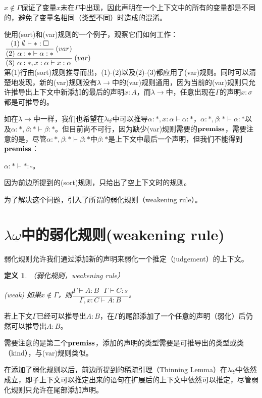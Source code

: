 \documentclass[UTF8]{article}
\newtheorem{thm}{定义}[section]
\begin{document}
		$x\not\in\Gamma$保证了变量$x$未在$\Gamma$中出现，因此声明在一个上下文中的所有的变量都是不同的，避免了变量名相同（类型不同）时造成的混淆。

		使用(sort)和(var)规则的一个例子，观察它们如何工作：\\

		$\cfrac{\cfrac{(1)\ \emptyset\vdash*:\square}{(2)\ \alpha:*\vdash\alpha:*}\ (var)}{(3)\ \alpha:*,x:\alpha\vdash x:\alpha}\ (var)$\\
		
		第(1)行由(sort)规则推导而出，(1)-(2)以及(2)-(3)都应用了(var)规则。同时可以清楚地发现，新的(var)规则没有$\lambda{\rightarrow}$中的(var)规则通用，因为当前的(var)规则只允许推导出上下文中新添加的最后的声明$x:A$，而$\lambda{\rightarrow}$中，任意出现在$\Gamma$的声明$x:\sigma$都是可推导的。
		
		如在$\lambda\rightarrow$中一样，我们也希望在$\lambda{\underline{\omega}}$中可以推导$\alpha:*,x:\alpha\vdash\alpha:*$，$\alpha:*,\beta:*\vdash\alpha:*$以及$\alpha:*,\beta:*\vdash\beta:*$。但目前尚不可行，因为缺少(var)规则需要的$\bf premiss$，需要注意的是，尽管$\alpha:*,\beta:*\vdash\beta:*$中$\beta:*$是上下文中最后一个声明，但我们不能得到$\bf premiss$：
		
		$\alpha:*\vdash*:\square$。
		
		因为前边所提到的(sort)规则，只给出了空上下文时的规则。
		
		为了解决这个问题，引入了所谓的弱化规则（weakening rule）。
		
	\section{$\lambda{\underline{\omega}}$中的弱化规则(weakening rule)}
		弱化规则允许我们通过添加新的声明来弱化一个推定（judgement）的上下文。
		
		\begin{thm}（弱化规则，weakening rule）
			
			(weak) 如果$x\not\in\Gamma$，则$\dfrac{\Gamma\vdash A:B\ \ \ \Gamma\vdash C:s}{\Gamma,x:C\vdash A:B}$。
		\end{thm}
		
		若上下文$\Gamma$已经可以推导出$A:B$，在$\Gamma$的尾部添加了一个任意的声明（弱化）后仍然可以推导出$A:B$。
		
		需要注意的是第二个$\bf premiss$，添加的声明的类型需要是可推导出的类型或类（kind），与(var)规则类似。
		
		在添加了弱化规则以后，前边所提到的稀疏引理（Thinning Lemma）在$\lambda{\underline{\omega}}$中依然成立，即子上下文可以推定出来的语句在扩展后的上下文中依然可以推定，尽管弱化规则只允许在尾部添加声明。
		
\end{document}
